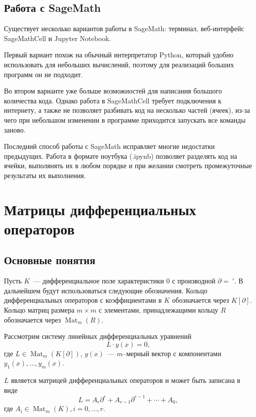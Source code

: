     \subsection{Работа с SageMath}
        Существует несколько вариантов работы в SageMath: терминал, веб-интерфейс SageMathCell и 
        Jupyter Notebook.


        Первый вариант похож на обычный интерпретатор Python, который удобно 
        использовать для небольших вычислений, поэтому для реализаций больших программ он 
        не подходит.


        Во втором варианте уже больше возможностей для написания большого количества кода. 
        Однако работа в SageMathCell требует подключения к интернету, а также не позволяет 
        разбивать код на несколько частей (ячеек), из-за чего при небольшом изменении в 
        программе приходится запускать все команды заново.


        Последний способ работы с SageMath исправляет многие недостатки предыдущих.
        Работа в формате ноутбука (.ipynb) позволяет разделять код на ячейки, выполянять их
        в любом порядке и при желании смотреть промежуточные результаты их выполнения.
\def\ord{\mathop{\mathrm{ord}}\nolimits}
\def\mat{\mathop{\mathrm{Mat}}\nolimits}
\def\rank{\mathop{\mathrm{rank}}\nolimits}
\def\lc{\ell c}
\def\max{\mathop{\mathrm{max}}\nolimits}

\newpage
\section{Матрицы дифференциальных операторов}
    \subsection{Основные понятия}
        Пусть $K$~--- дифференциальное поле характеристики 0 с производной
        $\partial =~'$. В дальнейшем будут использоваться следующие обозначения.
        Кольцо дифференциальных операторов с коэффициентами в $K$ обозначается через
        $K[\partial]$. Кольцо матриц размера $m \times m$ с элементами,
        принадлежащими кольцу $R$ обозначается через $\mat_m(R)$.


        Рассмотрим систему линейных дифференциальных уравнений $$L \cdot y(x)=0,$$
        где $L\in \mat_m(K[\partial])$, $y(x)$~---
        $m$--мерный вектор с компонентами $y_1(x),...,y_m(x)$.


        $L$ является матрицей дифференциальных операторов и может быть
        записана в виде $$L=A_r\partial^r+A_{r-1}\partial^{r-1}+\cdots+A_0,$$
        где $A_i \in \mat_m(K), i=0,...,r$. 


